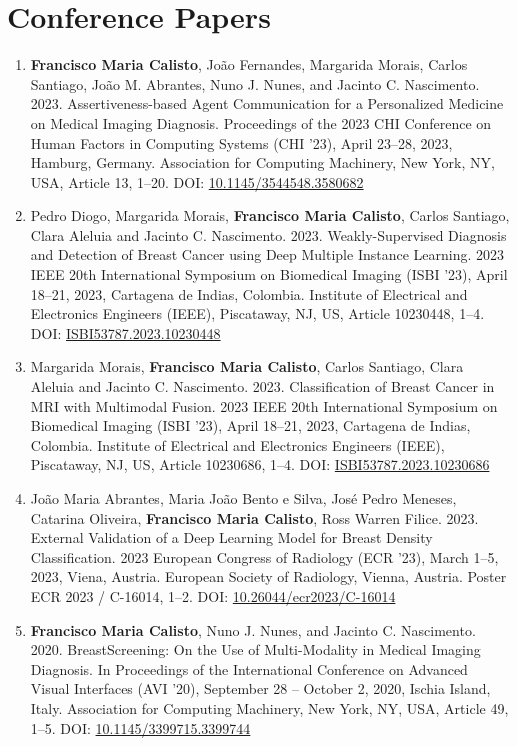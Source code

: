 \section*{Conference Papers}
\label{sec:chap00100601}

\begin{enumerate}
\item {\bf Francisco Maria Calisto}, Jo\~{a}o Fernandes, Margarida Morais, Carlos Santiago, Jo\~{a}o M. Abrantes, Nuno J. Nunes, and Jacinto C. Nascimento. 2023. Assertiveness-based Agent Communication for a Personalized Medicine on Medical Imaging Diagnosis. Proceedings of the 2023 CHI Conference on Human Factors in Computing Systems (CHI '23), April 23--28, 2023, Hamburg, Germany. Association for Computing Machinery, New York, NY, USA, Article 13, 1–20. DOI: \href{https://doi.org/10.1145/3544548.3580682}{10.1145/3544548.3580682}
\item Pedro Diogo, Margarida Morais, {\bf Francisco Maria Calisto}, Carlos Santiago, Clara Aleluia and Jacinto C. Nascimento. 2023. Weakly-Supervised Diagnosis and Detection of Breast Cancer using Deep Multiple Instance Learning. 2023 IEEE 20th International Symposium on Biomedical Imaging (ISBI '23), April 18--21, 2023, Cartagena de Indias, Colombia. Institute of Electrical and Electronics Engineers (IEEE), Piscataway, NJ, US, Article 10230448, 1–4. DOI: \href{https://doi.org/10.1109/ISBI53787.2023.10230448}{ISBI53787.2023.10230448}
\item Margarida Morais, {\bf Francisco Maria Calisto}, Carlos Santiago, Clara Aleluia and Jacinto C. Nascimento. 2023. Classification of Breast Cancer in MRI with Multimodal Fusion. 2023 IEEE 20th International Symposium on Biomedical Imaging (ISBI '23), April 18--21, 2023, Cartagena de Indias, Colombia. Institute of Electrical and Electronics Engineers (IEEE), Piscataway, NJ, US, Article 10230686, 1–4. DOI: \href{https://doi.org/10.1109/ISBI53787.2023.10230686}{ISBI53787.2023.10230686}
\item Jo\~{a}o Maria Abrantes, Maria Jo\~{a}o Bento e Silva, Jos\'{e} Pedro Meneses, Catarina Oliveira, {\bf Francisco Maria Calisto}, Ross Warren Filice. 2023. External Validation of a Deep Learning Model for Breast Density Classification. 2023 European Congress of Radiology (ECR '23), March 1--5, 2023, Viena, Austria. European Society of Radiology, Vienna, Austria. Poster ECR 2023 / C-16014, 1–2. DOI: \href{https://dx.doi.org/10.26044/ecr2023/C-16014}{10.26044/ecr2023/C-16014}
\item {\bf Francisco Maria Calisto}, Nuno J. Nunes, and Jacinto C. Nascimento. 2020. BreastScreening: On the Use of Multi-Modality in Medical Imaging Diagnosis. In Proceedings of the International Conference on Advanced Visual Interfaces (AVI '20), September 28 -- October 2, 2020, Ischia Island, Italy. Association for Computing Machinery, New York, NY, USA, Article 49, 1–5. DOI: \href{https://doi.org/10.1145/3399715.3399744}{10.1145/3399715.3399744}

\end{enumerate}
